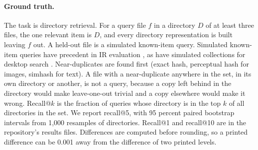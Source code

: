 \documentclass[11pt]{article}
\begin{document}
\begin{table}[t]
\centering\small
\caption{The draws of single folders, four of Zenodo records and two of GitHub directories. Directories per image-fraction bucket $[0,.2)$, $[.2,.5)$, $[.5,.8)$, $[.8,1]$; queries are leave-one-out files after deduplication, counted as scored in the session that reports each set. File size is the sum of the kept files' bytes.}
\label{tab:corpora}
\end{table}

\paragraph{Ground truth.} The task is directory retrieval. For a query file $f$ in a directory $D$ of at least three files, the one relevant item is $D$, and every directory representation is built leaving $f$ out. A held-out file is a simulated known-item query. Simulated known-item queries have precedent in IR evaluation \citep{azzopardi2007simulated}, as have simulated collections for desktop search \citep{kim2009pseudodesktop}. Near-duplicates are found first (exact hash, perceptual hash for images, simhash for text). A file with a near-duplicate anywhere in the set, in its own directory or another, is not a query, because a copy left behind in the directory would make leave-one-out trivial and a copy elsewhere would make it wrong. Recall@$k$ is the fraction of queries whose directory is in the top $k$ of all directories in the set. We report recall@5, with 95 percent paired bootstrap intervals from 1,000 resamples of directories. Recall@1 and recall@10 are in the repository's results files. Differences are computed before rounding, so a printed difference can be 0.001 away from the difference of two printed levels.
\end{document}

